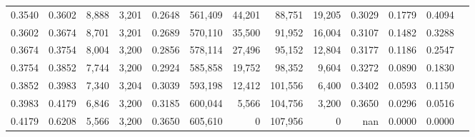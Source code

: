 \begin{tabular}{rrrrrrrrrrrrr}
0.3540 & 0.3602 &  8,888 & 3,201 &                                     0.2648 & 561,409 &  44,201 &  88,751 &  19,205 & 0.3029 & 0.1779 & 0.4094 \\
0.3602 & 0.3674 &  8,701 & 3,201 &                                     0.2689 & 570,110 &  35,500 &  91,952 &  16,004 & 0.3107 & 0.1482 & 0.3288 \\
0.3674 & 0.3754 &  8,004 & 3,200 &                                     0.2856 & 578,114 &  27,496 &  95,152 &  12,804 & 0.3177 & 0.1186 & 0.2547 \\
0.3754 & 0.3852 &  7,744 & 3,200 &                                     0.2924 & 585,858 &  19,752 &  98,352 &   9,604 & 0.3272 & 0.0890 & 0.1830 \\
0.3852 & 0.3983 &  7,340 & 3,204 &                                     0.3039 & 593,198 &  12,412 & 101,556 &   6,400 & 0.3402 & 0.0593 & 0.1150 \\
0.3983 & 0.4179 &  6,846 & 3,200 &                                     0.3185 & 600,044 &   5,566 & 104,756 &   3,200 & 0.3650 & 0.0296 & 0.0516 \\
0.4179 & 0.6208 &  5,566 & 3,200 &                                     0.3650 & 605,610 &       0 & 107,956 &       0 &    nan & 0.0000 & 0.0000 \\
\bottomrule
\end{tabular}
